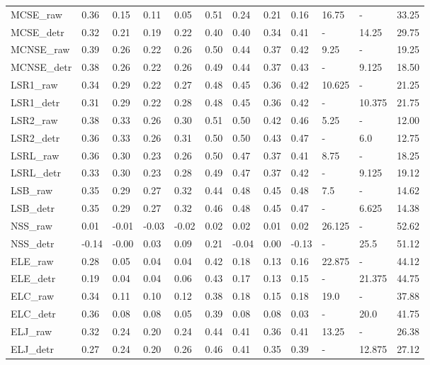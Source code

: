 \begin{tabular}{lllllllllllr}
\midrule
MCSE\_raw & 0.36 & 0.15 & 0.11 & 0.05 & 0.51 & 0.24 & 0.21 & 0.16 & 16.75 & - & 33.25 \\
MCSE\_detr & 0.32 & 0.21 & 0.19 & 0.22 & 0.40 & 0.40 & 0.34 & 0.41 & - & 14.25 & 29.75 \\
\midrule
MCNSE\_raw & 0.39 & 0.26 & 0.22 & 0.26 & 0.50 & 0.44 & 0.37 & 0.42 & 9.25 & - & 19.25 \\
MCNSE\_detr & 0.38 & 0.26 & 0.22 & 0.26 & 0.49 & 0.44 & 0.37 & 0.43 & - & 9.125 & 18.50 \\
\midrule
LSR1\_raw & 0.34 & 0.29 & 0.22 & 0.27 & 0.48 & 0.45 & 0.36 & 0.42 & 10.625 & - & 21.25 \\
LSR1\_detr & 0.31 & 0.29 & 0.22 & 0.28 & 0.48 & 0.45 & 0.36 & 0.42 & - & 10.375 & 21.75 \\
\midrule
LSR2\_raw & 0.38 & 0.33 & 0.26 & 0.30 & 0.51 & 0.50 & 0.42 & 0.46 & 5.25 & - & 12.00 \\
LSR2\_detr & 0.36 & 0.33 & 0.26 & 0.31 & 0.50 & 0.50 & 0.43 & 0.47 & - & 6.0 & 12.75 \\
\midrule
LSRL\_raw & 0.36 & 0.30 & 0.23 & 0.26 & 0.50 & 0.47 & 0.37 & 0.41 & 8.75 & - & 18.25 \\
LSRL\_detr & 0.33 & 0.30 & 0.23 & 0.28 & 0.49 & 0.47 & 0.37 & 0.42 & - & 9.125 & 19.12 \\
\midrule
LSB\_raw & 0.35 & 0.29 & 0.27 & 0.32 & 0.44 & 0.48 & 0.45 & 0.48 & 7.5 & - & 14.62 \\
LSB\_detr & 0.35 & 0.29 & 0.27 & 0.32 & 0.46 & 0.48 & 0.45 & 0.47 & - & 6.625 & 14.38 \\
\midrule
NSS\_raw & 0.01 & -0.01 & -0.03 & -0.02 & 0.02 & 0.02 & 0.01 & 0.02 & 26.125 & - & 52.62 \\
NSS\_detr & -0.14 & -0.00 & 0.03 & 0.09 & 0.21 & -0.04 & 0.00 & -0.13 & - & 25.5 & 51.12 \\
\midrule
ELE\_raw & 0.28 & 0.05 & 0.04 & 0.04 & 0.42 & 0.18 & 0.13 & 0.16 & 22.875 & - & 44.12 \\
ELE\_detr & 0.19 & 0.04 & 0.04 & 0.06 & 0.43 & 0.17 & 0.13 & 0.15 & - & 21.375 & 44.75 \\
\midrule
ELC\_raw & 0.34 & 0.11 & 0.10 & 0.12 & 0.38 & 0.18 & 0.15 & 0.18 & 19.0 & - & 37.88 \\
ELC\_detr & 0.36 & 0.08 & 0.08 & 0.05 & 0.39 & 0.08 & 0.08 & 0.03 & - & 20.0 & 41.75 \\
\midrule
ELJ\_raw & 0.32 & 0.24 & 0.20 & 0.24 & 0.44 & 0.41 & 0.36 & 0.41 & 13.25 & - & 26.38 \\
ELJ\_detr & 0.27 & 0.24 & 0.20 & 0.26 & 0.46 & 0.41 & 0.35 & 0.39 & - & 12.875 & 27.12 \\

\end{tabular}
